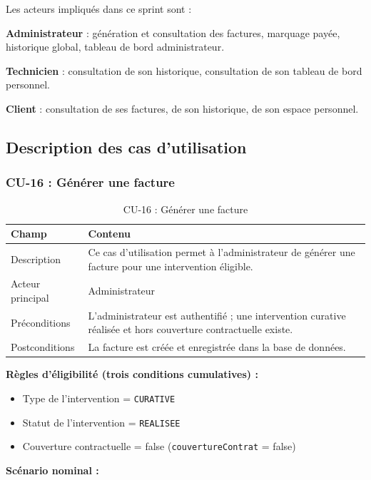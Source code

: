 Les acteurs impliqués dans ce sprint sont :

\textbf{Administrateur} : génération et consultation des factures, marquage payée, historique global,
tableau de bord administrateur.

\textbf{Technicien} : consultation de son historique, consultation de son tableau de bord personnel.

\textbf{Client} : consultation de ses factures, de son historique, de son espace personnel.

\subsection{Description des cas d'utilisation}

\subsubsection{CU-16 : Générer une facture}

\begin{table}[H]
\centering
\caption{CU-16 : Générer une facture}
\label{tab:ch5:cu16}
\begin{tabular}{|p{3.5cm}|p{11cm}|}
\hline
\textbf{Champ} & \textbf{Contenu} \\
\hline
Description & Ce cas d'utilisation permet à l'administrateur de générer une facture pour une
intervention éligible. \\
\hline
Acteur principal & Administrateur \\
\hline
Préconditions & L'administrateur est authentifié ; une intervention curative réalisée et hors
couverture contractuelle existe. \\
\hline
Postconditions & La facture est créée et enregistrée dans la base de données. \\
\hline
\end{tabular}
\end{table}

\textbf{Règles d'éligibilité (trois conditions cumulatives) :}

\begin{itemize}
    \item Type de l'intervention = \texttt{CURATIVE}
    \item Statut de l'intervention = \texttt{REALISEE}
    \item Couverture contractuelle = false (\texttt{couvertureContrat} = false)
\end{itemize}

\textbf{Scénario nominal :}

